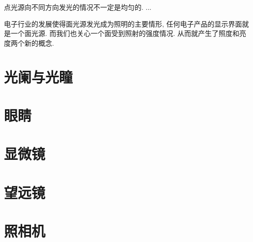 点光源向不同方向发光的情况不一定是均匀的. ...

电子行业的发展使得面光源发光成为照明的主要情形, 任何电子产品的显示界面就是一个面光源. 而我们也关心一个面受到照射的强度情况. 从而就产生了照度和亮度两个新的概念.


\section{光阑与光瞳}

\section{眼睛}

\section{显微镜}

\section{望远镜}

\section{照相机}